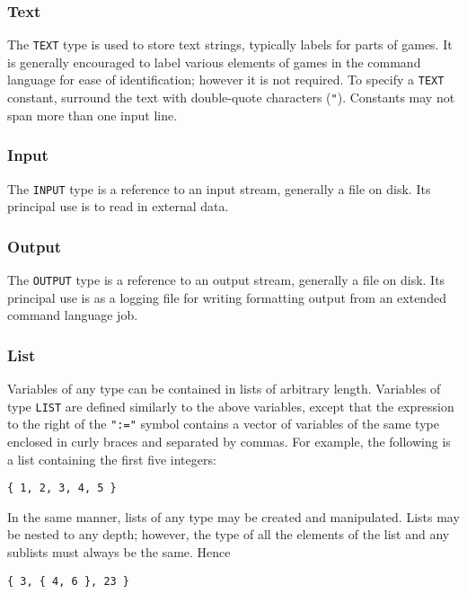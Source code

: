 \subsubsection{Text}

The {\tt TEXT} type is used to store text strings, typically labels
for parts of games.  It is generally encouraged to label various
elements of games in the command language for ease of identification;
however it is not required.  To specify a {\tt TEXT} constant,
surround the text with double-quote characters ({\tt "}).  Constants
may not span more than one input line.

\subsubsection{Input}

The {\tt INPUT} type is a reference to an input stream, generally a
file on disk.  Its principal use is to read in external data.

\subsubsection{Output}

The {\tt OUTPUT} type is a reference to an output stream, generally a
file on disk.  Its principal use is as a logging file for writing
formatting output from an extended command language job.

\subsubsection{List}

Variables of any type can be contained in lists of arbitrary length.
Variables of type {\tt LIST} are defined similarly to the above
variables, except that the expression to the right of the {\tt ":="}
symbol contains a vector of variables of the same type enclosed in
curly braces and separated by commas.  For example, the following is a
list containing the first five integers:

\begin{verbatim}
{ 1, 2, 3, 4, 5 }
\end{verbatim}

\noindent In the same manner, lists of any type may be created and
manipulated.  Lists may be nested to any depth; however, the type of
all the elements of the list and any sublists must always be the same.
Hence

\begin{verbatim}
{ 3, { 4, 6 }, 23 }
\end{verbatim}

